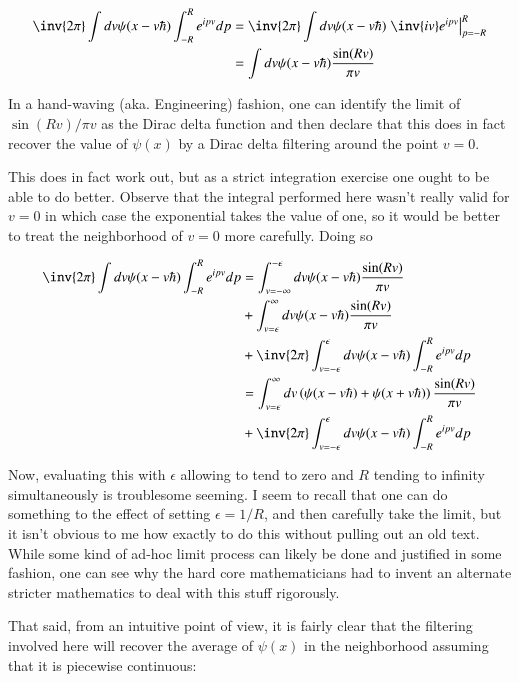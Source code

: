 \begin{align*}
\inv{{2\pi}} \int dv \psi(x -v\hbar) \int_{-R}^R e^{i p v} dp 
&= \inv{{2\pi}} \int dv \psi(x - v\hbar) \left. \inv{i v} e^{i p v} \right\vert_{p=-R}^R \\
&= \int dv \psi(x - v\hbar) \frac{\sin(R v)}{\pi v} \\
\end{align*}

In a hand-waving (aka. Engineering) fashion, one can identify the limit of $\sin(Rv)/\pi v$ as the Dirac delta function and
then declare that this does in fact recover the value of $\psi(x)$ by a Dirac delta filtering around the point $v=0$.

This does in fact work out, but as a strict integration exercise one ought to be able to do better.
Observe that the integral performed here wasn't really valid for $v=0$ in which case the exponential takes the value of one, so it would be
better to treat the neighborhood of $v=0$ more carefully.  Doing so

\begin{align*}
\inv{{2\pi}} \int dv \psi(x -v\hbar) \int_{-R}^R e^{i p v} dp 
&= \int_{v=-\infty}^{-\epsilon} dv \psi(x - v\hbar) \frac{\sin(R v)}{\pi v} \\
&+ \int_{v=\epsilon}^\infty dv \psi(x - v\hbar) \frac{\sin(R v)}{\pi v} \\
&+ \inv{{2\pi}} \int_{v=-\epsilon}^\epsilon dv \psi(x - v\hbar) \int_{-R}^R e^{i p v} dp \\
&= \int_{v=\epsilon}^\infty dv \left( \psi(x - v\hbar) +\psi(x + v\hbar) \right) \frac{\sin(R v)}{\pi v} \\
&+ \inv{{2\pi}} \int_{v=-\epsilon}^\epsilon dv \psi(x - v\hbar) \int_{-R}^R e^{i p v} dp \\
\end{align*}

Now, evaluating this with $\epsilon$ allowing to tend to zero and $R$ tending to infinity simultaneously is troublesome seeming.  I seem to recall that one
can do something to the effect of setting $\epsilon=1/R$, and then carefully take the limit, but it isn't obvious to me how exactly to do this without
pulling out an old text.
While some kind of ad-hoc limit process can likely be done and justified in some fashion, one can see why the hard core mathematicians had to invent
an alternate stricter mathematics to deal with this stuff rigorously.

That said, from an intuitive point of view, it is fairly clear that the filtering involved here will recover the average of
$\psi(x)$ in the neighborhood assuming that it is piecewise continuous:

